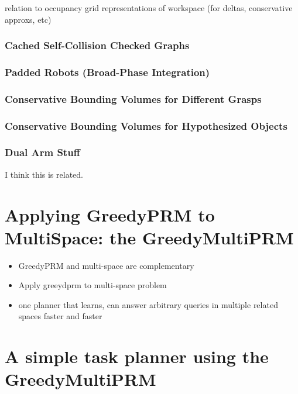 \documentclass{report}
\begin{document}
relation to occupancy grid representations of workspace
(for deltas, conservative approxs, etc)

\subsection{Cached Self-Collision Checked Graphs}

\subsection{Padded Robots (Broad-Phase Integration)}

\subsection{Conservative Bounding Volumes for Different Grasps}

\subsection{Conservative Bounding Volumes for Hypothesized Objects}

\subsection{Dual Arm Stuff}

I think this is related.


\newpage
\chapter{Applying GreedyPRM to MultiSpace: the GreedyMultiPRM}

\begin{itemize}
\item GreedyPRM and multi-space are complementary
\item Apply greeydprm to multi-space problem
\item one planner that learns, can answer arbitrary queries
   in multiple related spaces faster and faster
\end{itemize}


\newpage
\chapter{A simple task planner using the GreedyMultiPRM}
\end{document}

